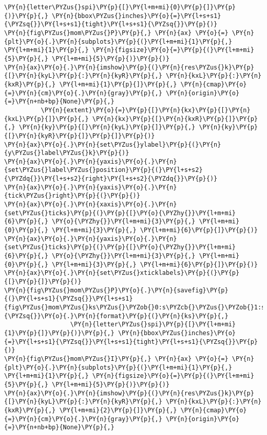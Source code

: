 \begin{Verbatim}[commandchars=\\\{\}]
                  \PY{n}{letter\PYZus{}spi}\PY{p}{[}\PY{l+m+mi}{0}\PY{p}{]}\PY{p}{)}\PY{p}{,} \PY{n}{bbox\PYZus{}inches}\PY{o}{=}\PY{l+s+s1}{\PYZsq{}}\PY{l+s+s1}{tight}\PY{l+s+s1}{\PYZsq{}}\PY{p}{)}
\PY{n}{fig\PYZus{}mom\PYZus{}P}\PY{p}{,} \PY{n}{ax} \PY{o}{=} \PY{n}{plt}\PY{o}{.}\PY{n}{subplots}\PY{p}{(}\PY{l+m+mi}{1}\PY{p}{,} \PY{l+m+mi}{1}\PY{p}{,} \PY{n}{figsize}\PY{o}{=}\PY{p}{(}\PY{l+m+mi}{5}\PY{p}{,} \PY{l+m+mi}{5}\PY{p}{)}\PY{p}{)}
\PY{n}{ax}\PY{o}{.}\PY{n}{imshow}\PY{p}{(}\PY{n}{res\PYZus{}k}\PY{p}{[}\PY{n}{kyL}\PY{p}{:}\PY{n}{kyR}\PY{p}{,} \PY{n}{kxL}\PY{p}{:}\PY{n}{kxR}\PY{p}{,} \PY{l+m+mi}{1}\PY{p}{]}\PY{p}{,} \PY{n}{cmap}\PY{o}{=}\PY{n}{cm}\PY{o}{.}\PY{n}{gray}\PY{p}{,} \PY{n}{origin}\PY{o}{=}\PY{n+nb+bp}{None}\PY{p}{,}
          \PY{n}{extent}\PY{o}{=}\PY{p}{[}\PY{n}{kx}\PY{p}{[}\PY{n}{kxL}\PY{p}{]}\PY{p}{,} \PY{n}{kx}\PY{p}{[}\PY{n}{kxR}\PY{p}{]}\PY{p}{,} \PY{n}{ky}\PY{p}{[}\PY{n}{kyL}\PY{p}{]}\PY{p}{,} \PY{n}{ky}\PY{p}{[}\PY{n}{kyR}\PY{p}{]}\PY{p}{]}\PY{p}{)}
\PY{n}{ax}\PY{o}{.}\PY{n}{set\PYZus{}ylabel}\PY{p}{(}\PY{n}{y\PYZus{}label\PYZus{}k}\PY{p}{)}
\PY{n}{ax}\PY{o}{.}\PY{n}{yaxis}\PY{o}{.}\PY{n}{set\PYZus{}label\PYZus{}position}\PY{p}{(}\PY{l+s+s2}{\PYZdq{}}\PY{l+s+s2}{right}\PY{l+s+s2}{\PYZdq{}}\PY{p}{)}
\PY{n}{ax}\PY{o}{.}\PY{n}{yaxis}\PY{o}{.}\PY{n}{tick\PYZus{}right}\PY{p}{(}\PY{p}{)}
\PY{n}{ax}\PY{o}{.}\PY{n}{xaxis}\PY{o}{.}\PY{n}{set\PYZus{}ticks}\PY{p}{(}\PY{p}{[}\PY{o}{\PYZhy{}}\PY{l+m+mi}{6}\PY{p}{,} \PY{o}{\PYZhy{}}\PY{l+m+mi}{3}\PY{p}{,} \PY{l+m+mi}{0}\PY{p}{,} \PY{l+m+mi}{3}\PY{p}{,} \PY{l+m+mi}{6}\PY{p}{]}\PY{p}{)}
\PY{n}{ax}\PY{o}{.}\PY{n}{yaxis}\PY{o}{.}\PY{n}{set\PYZus{}ticks}\PY{p}{(}\PY{p}{[}\PY{o}{\PYZhy{}}\PY{l+m+mi}{6}\PY{p}{,} \PY{o}{\PYZhy{}}\PY{l+m+mi}{3}\PY{p}{,} \PY{l+m+mi}{0}\PY{p}{,} \PY{l+m+mi}{3}\PY{p}{,} \PY{l+m+mi}{6}\PY{p}{]}\PY{p}{)}
\PY{n}{ax}\PY{o}{.}\PY{n}{set\PYZus{}xticklabels}\PY{p}{(}\PY{p}{[}\PY{p}{]}\PY{p}{)}
\PY{n}{fig\PYZus{}mom\PYZus{}P}\PY{o}{.}\PY{n}{savefig}\PY{p}{(}\PY{l+s+s1}{\PYZsq{}}\PY{l+s+s1}{fig\PYZus{}mom\PYZus{}ks\PYZus{}\PYZob{}0:s\PYZcb{}\PYZus{}\PYZob{}1:s\PYZcb{}}\PY{l+s+s1}{\PYZsq{}}\PY{o}{.}\PY{n}{format}\PY{p}{(}\PY{n}{ks}\PY{p}{,}
                  \PY{n}{letter\PYZus{}spi}\PY{p}{[}\PY{l+m+mi}{1}\PY{p}{]}\PY{p}{)}\PY{p}{,} \PY{n}{bbox\PYZus{}inches}\PY{o}{=}\PY{l+s+s1}{\PYZsq{}}\PY{l+s+s1}{tight}\PY{l+s+s1}{\PYZsq{}}\PY{p}{)}
\PY{n}{fig\PYZus{}mom\PYZus{}I}\PY{p}{,} \PY{n}{ax} \PY{o}{=} \PY{n}{plt}\PY{o}{.}\PY{n}{subplots}\PY{p}{(}\PY{l+m+mi}{1}\PY{p}{,} \PY{l+m+mi}{1}\PY{p}{,} \PY{n}{figsize}\PY{o}{=}\PY{p}{(}\PY{l+m+mi}{5}\PY{p}{,} \PY{l+m+mi}{5}\PY{p}{)}\PY{p}{)}
\PY{n}{ax}\PY{o}{.}\PY{n}{imshow}\PY{p}{(}\PY{n}{res\PYZus{}k}\PY{p}{[}\PY{n}{kyL}\PY{p}{:}\PY{n}{kyR}\PY{p}{,} \PY{n}{kxL}\PY{p}{:}\PY{n}{kxR}\PY{p}{,} \PY{l+m+mi}{2}\PY{p}{]}\PY{p}{,} \PY{n}{cmap}\PY{o}{=}\PY{n}{cm}\PY{o}{.}\PY{n}{gray}\PY{p}{,} \PY{n}{origin}\PY{o}{=}\PY{n+nb+bp}{None}\PY{p}{,}

\end{Verbatim}
